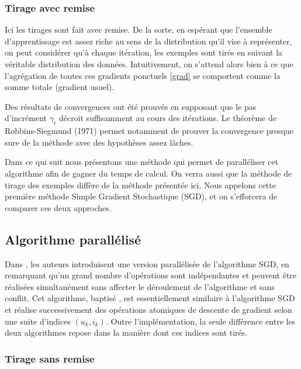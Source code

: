 \documentclass[10pt,a4paper]{article}
\begin{document}
\subsubsection*{Tirage avec remise}

Ici les tirages sont fait avec remise. De la sorte, en espérant que l'ensemble d'apprentissage est assez riche au sens de la distribution qu'il vise à représenter, on peut considérer qu'à chaque itération, les exemples sont tirés en suivant la véritable distribution des données. Intuitivement, on s'attend alors bien à ce que l'agrégation de toutes ces gradients ponctuels \eqref{grad} se comportent comme la somme totale (gradient usuel).

Des résultats de convergences ont été prouvés en supposant que le pas d'incrément $\gamma_t$ décroit suffisamment au cours des itérations. Le théorème de Robbins-Siegmund (1971) permet notamment de prouver la convergence presque sure de la méthode avec des hypothèses assez lâches.

Dans ce qui suit nous présentons une méthode qui permet de paralléliser cet algorithme afin de gagner du temps de calcul. On verra aussi que la méthode de tirage des exemples diffère de la méthode présentée ici. Nous appelons cette première méthode Simple Gradient Stochastique (SGD), et on s'efforcera de comparer ces deux approches.

\subsection{Algorithme parallélisé \jel }

Dans \cite{jelly}, les auteurs introduisent une version parallélisée de l'algorithme SGD, en remarquant qu'un grand nombre d'opérations sont indépendantes et peuvent être réalisées simultanément sans affecter le déroulement de l'algorithme et sans conflit. Cet algorithme, baptisé \jel, est essentiellement similaire à l'algorithme SGD et réalise successivement des opérations atomiques de descente de gradient selon une suite d'indices $(u_k,i_k)$. Outre l'implémentation, la seule différence entre les deux algorithmes repose dans la manière dont ces indices sont tirés.

\subsubsection*{Tirage sans remise}
\end{document}
